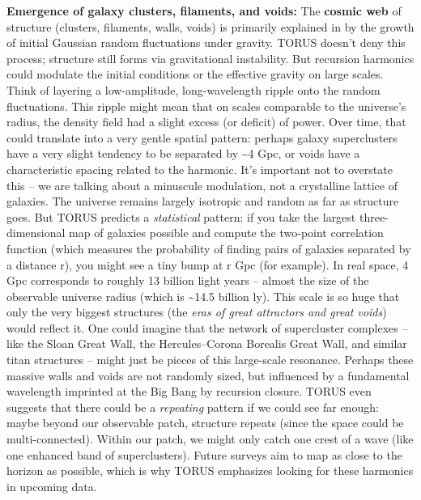 \documentclass[
]{article}
\begin{document}
\textbf{Emergence of galaxy clusters, filaments, and voids:} The
\textbf{cosmic web} of structure (clusters, filaments, walls, voids) is
primarily explained in \LambdaCDM by the growth of initial Gaussian random
fluctuations under gravity. TORUS doesn't deny this process; structure
still forms via gravitational instability. But recursion harmonics could
modulate the initial conditions or the effective gravity on large
scales. Think of layering a low-amplitude, long-wavelength ripple onto
the random fluctuations. This ripple might mean that on scales
comparable to the universe's radius, the density field had a slight
excess (or deficit) of power. Over time, that could translate into a
very gentle spatial pattern: perhaps galaxy superclusters have a very
slight tendency to be separated by \textasciitilde4 Gpc, or voids have a
characteristic spacing related to the harmonic. It's important not to
overstate this -- we are talking about a minuscule modulation, not a
crystalline lattice of galaxies. The universe remains largely isotropic
and random as far as structure goes. But TORUS predicts a
\emph{statistical} pattern: if you take the largest three-dimensional
map of galaxies possible and compute the two-point correlation function
(which measures the probability of finding pairs of galaxies separated
by a distance r), you might see a tiny bump at r  Gpc (for
example)\hspace{0pt}. In real space, 4 Gpc corresponds to roughly 13
billion light years -- almost the size of the observable universe radius
(which is \textasciitilde14.5 billion ly). This scale is so huge that
only the very biggest structures (the \emph{eras of great attractors and
great voids}) would reflect it. One could imagine that the network of
supercluster complexes -- like the Sloan Great Wall, the
Hercules--Corona Borealis Great Wall, and similar titan structures --
might just be pieces of this large-scale resonance. Perhaps these
massive walls and voids are not randomly sized, but influenced by a
fundamental wavelength imprinted at the Big Bang by recursion closure.
TORUS even suggests that there could be a \emph{repeating} pattern if we
could see far enough: maybe beyond our observable patch, structure
repeats (since the space could be multi-connected). Within our patch, we
might only catch one crest of a wave (like one enhanced band of
superclusters). Future surveys aim to map as close to the horizon as
possible, which is why TORUS emphasizes looking for these harmonics in
upcoming data\hspace{0pt}.
\end{document}
